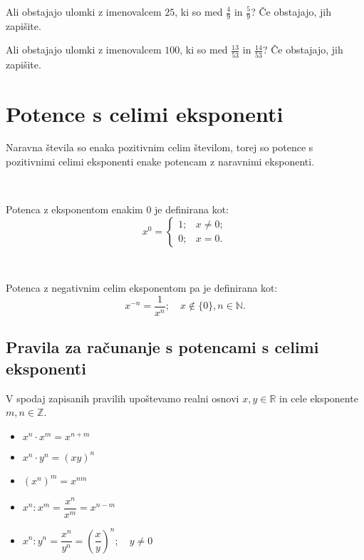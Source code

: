         
                    \begin{naloga}
                        Ali obstajajo ulomki z imenovalcem $25$, ki so med $\frac{4}{9}$ in $\frac{5}{9}$? Če obstajajo, jih zapišite.
                        
                    \end{naloga}
        
                    \begin{naloga}
                        Ali obstajajo ulomki z imenovalcem $100$, ki so med $\frac{13}{53}$ in $\frac{14}{53}$? Če obstajajo, jih zapišite.
                        
                    \end{naloga}
        
        

                    
    \newpage

    \section{Potence s celimi eksponenti}

            Naravna števila so enaka pozitivnim celim številom, torej so potence s pozitivnimi celimi eksponenti enake potencam z naravnimi eksponenti.

            ~

            Potenca z eksponentom enakim $0$ je definirana kot: 
            $$x^0=\begin{cases}
                1; &x\neq 0; \\
                0; &x=0.
            \end{cases}$$

            ~

            Potenca z negativnim celim eksponentom pa je definirana kot:
            $$x^{-n}=\dfrac{1}{x^n}; \quad x\notin\{0\}, n\in\mathbb{N}.$$

            
        \subsection*{Pravila za računanje s potencami s celimi eksponenti}
            V spodaj zapisanih pravilih upoštevamo realni osnovi $x,y\in\mathbb{R}$ in cele eksponente $m,n\in\mathbb{Z}$.
            \begin{itemize}
                \item $x^n\cdot x^m=x^{n+m}$
                \item $x^n\cdot y^n=(xy)^n$
                \item $\left(x^n\right)^m=x^{nm}$
                \item $x^n:x^m=\dfrac{x^n}{x^m}=x^{n-m}$
                \item $x^n:y^n=\dfrac{x^n}{y^n}=\left(\dfrac{x}{y}\right)^n; \quad y\neq 0$
            \end{itemize}


